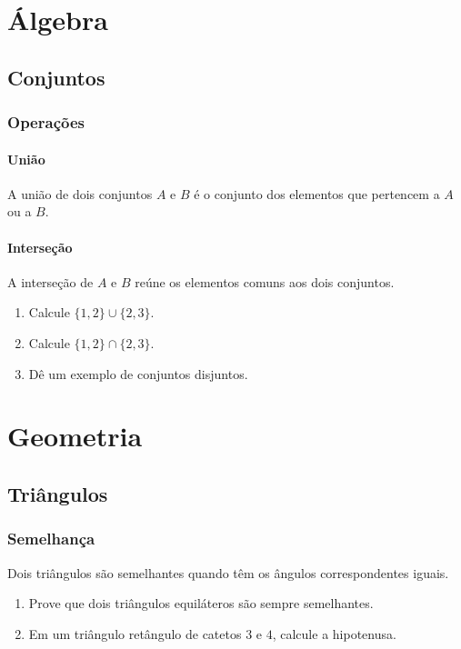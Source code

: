 \documentclass[11pt,oneside]{book}
\begin{document}
\part{Álgebra}
\chapter{Conjuntos}
\section{Operações}
\subsection{União}
A união de dois conjuntos $A$ e $B$ é o conjunto dos elementos que pertencem a $A$ ou a $B$.
\subsection{Interseção}
A interseção de $A$ e $B$ reúne os elementos comuns aos dois conjuntos.

\begin{enumerate}[label=\textbf{\arabic*.}]
\item Calcule $\{1,2\}\cup\{2,3\}$.
\item Calcule $\{1,2\}\cap\{2,3\}$.
\item Dê um exemplo de conjuntos disjuntos.
\end{enumerate}

\part{Geometria}
\chapter{Triângulos}
\section{Semelhança}
Dois triângulos são semelhantes quando têm os ângulos correspondentes iguais.

\begin{enumerate}[label=\textbf{\arabic*.}]
\item Prove que dois triângulos equiláteros são sempre semelhantes.
\item Em um triângulo retângulo de catetos $3$ e $4$, calcule a hipotenusa.
\end{enumerate}
\end{document}

